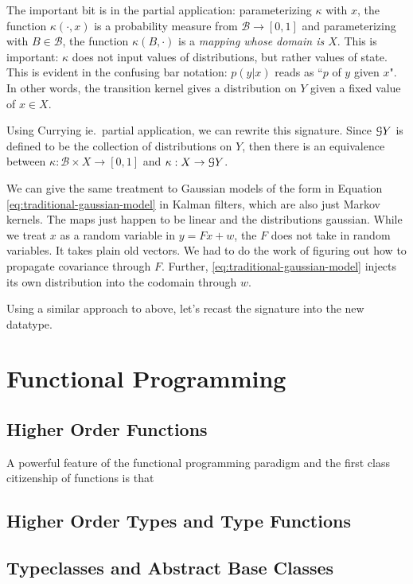 
The important bit is in the partial application: parameterizing $\kappa$ with $x$, the function $\kappa(\cdot, x)$ is a probability measure from $\mathcal{B} \rightarrow [0,1]$ and parameterizing with $B\in \mathcal{B}$, the function $\kappa(B,\cdot)$ is a \emph{mapping whose domain is $X$}.
This is important: $\kappa$ does not input values of distributions, but rather values of state.
This is evident in the confusing bar notation: $p(y|x)$ reads as ``$p$ of $y$ given $x$".
In other words, the transition kernel gives a distribution on $Y$ given a fixed value of $x\in X$.

Using Currying ie.\ partial application, we can rewrite this signature. 
Since $\mathcal{G} Y$ is defined to be the collection of distributions on $Y$, then there is an equivalence between $\kappa : \mathcal{B} \times X \rightarrow [0,1]$ and $\kappa : X \rightarrow \mathcal{G} Y$.

We can give the same treatment to Gaussian models of the form in Equation \ref{eq:traditional-gaussian-model} in Kalman filters, which are also just Markov kernels. The maps just happen to be linear and the distributions gaussian.
While we treat $x$ as a random variable in $y = Fx + w$, the $F$ does not take in random variables.
It takes plain old vectors.
We had to do the work of figuring out how to propagate covariance through $F$.
Further, \ref{eq:traditional-gaussian-model} injects its own distribution into the codomain through $w$.


Using a similar approach to above, let's recast the signature into the new datatype.


\section{Functional Programming}
\subsection{Higher Order Functions}

A powerful feature of the functional programming paradigm and the first class citizenship of functions is that 

\subsection{Higher Order Types and Type Functions}
\subsection{Typeclasses and Abstract Base Classes}

